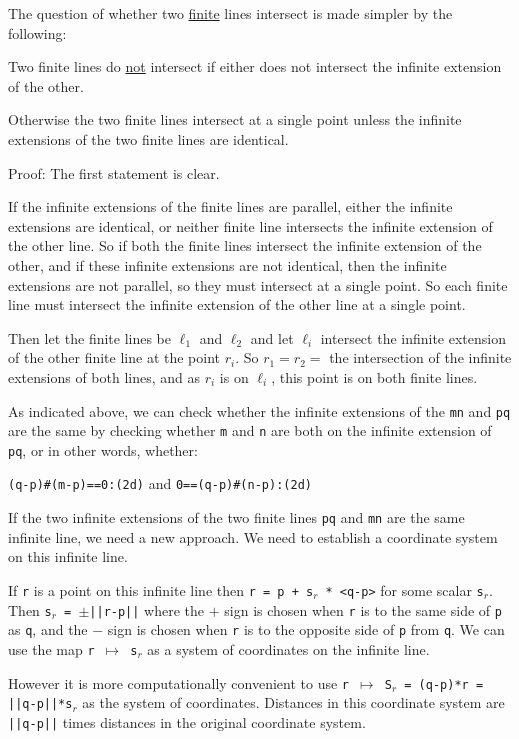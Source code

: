 \documentclass[12pt]{article}
\begin{document}
The question of whether two \underline{finite} lines intersect is made
simpler by the following:
\begin{lemma}
Two finite lines do \underline{not} intersect
if either does not intersect the infinite extension of the other.

Otherwise the two finite lines intersect at a single point unless
the infinite extensions of the two finite lines are identical.
\end{lemma}
\begin{indpar}{0.3in}
Proof: The first statement is clear.

If the infinite extensions of the finite lines are parallel, either
the infinite extensions are identical, or neither finite line
intersects the infinite extension of the other line.
So if both the finite lines intersect the infinite extension of the other,
and if these infinite extensions are not identical, then the
infinite extensions are not parallel, so they must intersect at a
single point.  So each finite line must intersect the infinite extension
of the other line at a single point.

Then let the finite lines be $\ell_1$ and $\ell_2$ and let
$\ell_i$ intersect the infinite extension of the other finite line
at the point $r_i$.  So $r_1=r_2=$ the intersection of the infinite
extensions of both lines, and as $r_i$ is on $\ell_i$, this point is
on both finite lines.
\end{indpar}

As indicated above,
we can check whether the infinite extensions of the {\tt mn} and {\tt pq}
are the same by checking whether {\tt m} and {\tt n} are both on
the infinite extension of {\tt pq}, or in other words, whether: \\
\centerline{{\tt (q-p)\#(m-p)==0:(2d)} and {\tt 0==(q-p)\#(n-p):(2d)}}

If the two infinite extensions of the two finite lines {\tt pq} and
{\tt mn} are the same
infinite line, we need a new approach.  We need to establish a coordinate
system on this infinite line.

If {\tt r} is a point on this infinite line then
{\tt r = p + s$_r$ * <q-p>} for some scalar {\tt s$_r$}.  Then
{\tt s$_r$ = $\pm$||r-p||} where the $+$ sign is chosen when {\tt r}
is to the same side of {\tt p} as {\tt q}, and the $-$ sign is chosen
when {\tt r} is to the opposite side of {\tt p} from {\tt q}.
We can use the map {\tt r $\mapsto$ s$_r$} as a system of coordinates
on the infinite line.

However it is more computationally convenient to use
{\tt r $\mapsto$ S$_r$ = (q-p)*r = ||q-p||*s$_r$} as the system of coordinates.
Distances in this coordinate system are {\tt ||q-p||} times distances in the
original coordinate system.
\end{document}
